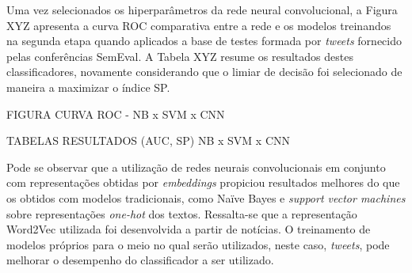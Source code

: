 Uma vez selecionados os hiperparâmetros da rede neural convolucional, a Figura XYZ apresenta a curva ROC comparativa
entre a rede e os modelos treinandos na segunda etapa quando aplicados a base de testes formada por \textit{tweets}
fornecido pelas conferências SemEval.
A Tabela XYZ resume os resultados destes classificadores, novamente considerando que o limiar de decisão foi selecionado
de maneira a maximizar o índice SP.

FIGURA CURVA ROC - NB x SVM x CNN

TABELAS RESULTADOS (AUC, SP)  NB x SVM x CNN

Pode se observar que a utilização de redes neurais convolucionais em conjunto com representações obtidas por
\textit{embeddings} propiciou resultados melhores do que os obtidos com modelos tradicionais, como Naïve Bayes e
\textit{support vector machines} sobre representações \textit{one-hot} dos textos.
Ressalta-se que a representação Word2Vec utilizada foi desenvolvida a partir de notícias.
O treinamento de modelos próprios para o meio no qual serão utilizados, neste caso, \textit{tweets}, pode melhorar o
desempenho do classificador a ser utilizado.
